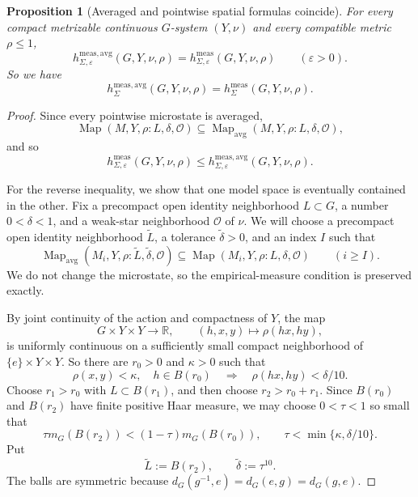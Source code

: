 \documentclass[12pt]{amsart}
\newtheorem{proposition}[proposition]{Proposition}
\theoremstyle{definition}
\newcommand{\Haar}{m_G}
\newcommand{\Map}{\operatorname{Map}}
\newcommand{\Mapavg}{\operatorname{Map}_{\mathrm{avg}}}
\newcommand{\cO}{\mathcal O}
\newcommand{\1}{\mathbf 1}
\newcommand{\eps}{\varepsilon}
\begin{document}
\begin{proposition}[Averaged and pointwise spatial formulas coincide]\label{prop:avg-standard}
For every compact metrizable continuous $G$-system $(Y,\nu)$ and every compatible metric $\rho\leq1$,
\[
 h^{\mathrm{meas,avg}}_{\Sigma,\eps}(G,Y,\nu,\rho)
 =h^{\mathrm{meas}}_{\Sigma,\eps}(G,Y,\nu,\rho)
 \qquad(\eps>0).
\]
So we have
\[
 h^{\mathrm{meas,avg}}_\Sigma(G,Y,\nu,\rho)
 =h^{\mathrm{meas}}_\Sigma(G,Y,\nu,\rho).
\]
\end{proposition}

\begin{proof}
Since every pointwise microstate is averaged,
\[
 \Map(M,Y,\rho:L,\delta,\cO)
 \subseteq \Mapavg(M,Y,\rho:L,\delta,\cO),
\]
and so
\[
 h^{\mathrm{meas}}_{\Sigma,\eps}(G,Y,\nu,\rho)
 \leq h^{\mathrm{meas,avg}}_{\Sigma,\eps}(G,Y,\nu,\rho).
\]

For the reverse inequality, we show that one model space is eventually contained in the other. Fix a precompact open identity neighborhood $L\subset G$, a number $0<\delta<1$, and a weak-star neighborhood $\cO$ of $\nu$. We will choose a precompact open identity neighborhood $\widetilde L$, a tolerance $\widetilde\delta>0$, and an index $I$ such that
\begin{equation}\label{eq:avg-to-standard-inclusion}
 \Mapavg(M_i,Y,\rho:\widetilde L,\widetilde\delta,\cO)
 \subseteq
 \Map(M_i,Y,\rho:L,\delta,\cO)
 \qquad(i\geq I).
\end{equation}
We do not change the microstate, so the empirical-measure condition is preserved exactly.

By joint continuity of the action and compactness of $Y$, the map
\[
 G\times Y\times Y\longrightarrow\mathbb R,
 \qquad (h,x,y)\longmapsto\rho(hx,hy),
\]
is uniformly continuous on a sufficiently small compact neighborhood of $\{e\}\times Y\times Y$. So there are $r_0>0$ and $\kappa>0$ such that
\begin{equation}\label{eq:local-equicontinuity}
 \rho(x,y)<\kappa,\quad h\in B(r_0)
 \quad\Longrightarrow\quad
 \rho(hx,hy)<\delta/10.
\end{equation}
Choose $r_1>r_0$ with $L\subset B(r_1)$, and then choose $r_2>r_0+r_1$. Since $B(r_0)$ and $B(r_2)$ have finite positive Haar measure, we may choose $0<\tau<1$ so small that
\begin{equation}\label{eq:tau-choices}
 \tau\Haar(B(r_2))<(1-\tau)\Haar(B(r_0)),
 \qquad
 \tau<\min\{\kappa,\delta/10\}.
\end{equation}
Put
\[
 \widetilde L:=B(r_2),\qquad \widetilde\delta:=\tau^{10}.
\]
The balls are symmetric because
$d_G(g^{-1},e)=d_G(e,g)=d_G(g,e)$.


\end{proof}
\end{document}
